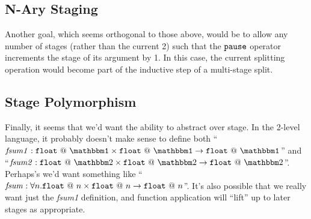 \documentclass[11pt]{article}
\makeatletter
\newcommand {\bbone} {\mathbbm 1}
\newcommand {\bbtwo} {\mathbbm 2}
\newcommand {\at} {{\tt~@~}}
\newcommand {\pause} {{\tt pause}}
\makeatother
\begin{document}
\subsection {N-Ary Staging}
Another goal, which seems orthogonal to those above, would be to allow any number of stages (rather than the current 2) such that the $\pause$ operator increments the stage of its argument by 1.  In this case, the current splitting operation would become part of the inductive step of a multi-stage split.  
\subsection {Stage Polymorphism}
Finally, it seems that we'd want the ability to abstract over stage.  In the 2-level language, it probably doesn't make sense to define both ``${\it fsum1} :  {\tt float \at \bbone \times float \at \bbone \to float \at \bbone}$'' and ``${\it fsum2} :  {\tt float} \at \bbtwo \times {\tt float} \at \bbtwo \to {\tt float} \at \bbtwo$''.  Perhaps's we'd want something like  ``${\it fsum} :  \forall n.{\tt float} \at n \times {\tt float} \at n \to {\tt float} \at n$''.  It's also possible that we really want just the {\it fsum1} definition, and function application will ``lift'' up to later stages as appropriate.
\end{document}
